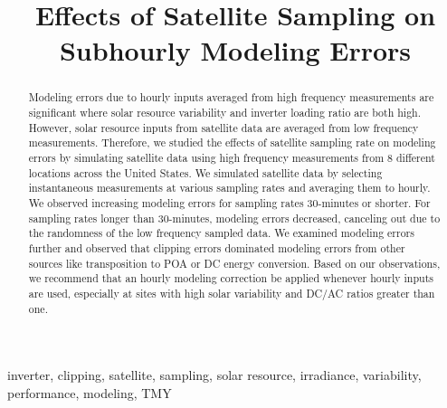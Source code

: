 \documentclass[conference]{IEEEtran}
\begin{document}
\title{Effects of Satellite Sampling on Subhourly Modeling Errors}

\author{
}

\maketitle

\begin{abstract}
Modeling errors due to hourly inputs averaged from high frequency measurements are significant where solar resource variability and inverter loading ratio are both high. However, solar resource inputs from satellite data are averaged from low frequency measurements. Therefore, we studied the effects of satellite sampling rate on modeling errors by simulating satellite data using high frequency measurements from 8 different locations across the United States. We simulated satellite data by selecting instantaneous measurements at various sampling rates and averaging them to hourly. We observed increasing modeling errors for sampling rates 30-minutes or shorter. For sampling rates longer than 30-minutes, modeling errors decreased, canceling out due to the randomness of the low frequency sampled data. We examined modeling errors further and observed that clipping errors dominated modeling errors from other sources like transposition to POA or DC energy conversion. Based on our observations, we recommend that an hourly modeling correction be applied whenever hourly inputs are used, especially at sites with high solar variability and DC/AC ratios greater than one.
\end{abstract}

\begin{IEEEkeywords}
inverter, clipping, satellite, sampling, solar resource, irradiance, variability, performance, modeling, TMY
\end{IEEEkeywords}
\end{document}
